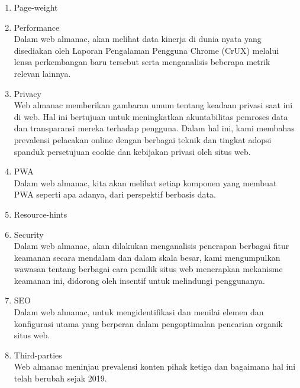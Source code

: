 \begin{enumerate}
	\item Page-weight\\
	
	\item Performance\\
	Dalam web almanac, akan melihat data kinerja di dunia nyata yang disediakan oleh Laporan Pengalaman Pengguna Chrome (CrUX) melalui lensa perkembangan baru tersebut serta menganalisis beberapa metrik relevan lainnya.
	\item Privacy\\
	Web almanac memberikan gambaran umum tentang keadaan privasi saat ini di web. Hal ini bertujuan untuk meningkatkan akuntabilitas pemroses data dan transparansi mereka terhadap pengguna. Dalam hal ini, kami membahas prevalensi pelacakan online dengan berbagai teknik dan tingkat adopsi spanduk persetujuan cookie dan kebijakan privasi oleh situs web.
	\item PWA\\
	Dalam web almanac, kita akan melihat setiap komponen yang membuat PWA seperti apa adanya, dari perspektif berbasis data.
	\item Resource-hints\\
	
	\item Security\\
	Dalam web almanac, akan dilakukan menganalisis penerapan berbagai fitur keamanan secara mendalam dan dalam skala besar, kami mengumpulkan wawasan tentang berbagai cara pemilik situs web menerapkan mekanisme keamanan ini, didorong oleh insentif untuk melindungi penggunanya.
	\item SEO\\
	Dalam web almanac, untuk mengidentifikasi dan menilai elemen dan konfigurasi utama yang berperan dalam pengoptimalan pencarian organik situs web.
	\item Third-parties\\
	Web almanac meninjau prevalensi konten pihak ketiga dan bagaimana hal ini telah berubah sejak 2019.
\end{enumerate}




